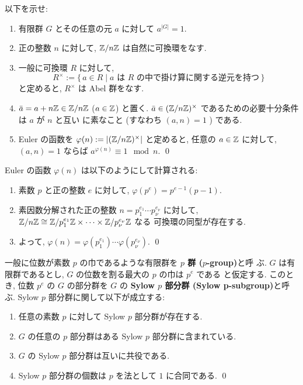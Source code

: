 \documentclass[12pt,twoside]{jarticle}
\def\Z{{\Bbb Z}} %
\def\isom{\cong}
\begin{document}
\begin{question}[Fermat]
  以下を示せ:
  \begin{enumerate}
  \item 有限群 $G$ とその任意の元 $a$ に対して $a^{|G|}=1$. 
  \item 正の整数 $n$ に対して, $\Z/n\Z$ は自然に可換環をなす.
  \item 一般に可換環 $R$ に対して,
    \begin{equation*}
      R^\times :=
      \{\, a\in R \mid \text{$a$ は $R$ の中で掛け算に関する逆元を持つ} \,\}
    \end{equation*}
    と定めると, $R^\times$ は Abel 群をなす.
  \item $\bar a = a + n\Z\in\Z/n\Z$ ($a\in\Z$) と置く. 
    $\bar a\in(\Z/n\Z)^\times$ であるための必要十分条件は $a$ が $n$ と互い
    に素なこと (すなわち $(a,n)=1$ ) である. 
  \item Euler の函数を $\varphi(n):=|(\Z/n\Z)^\times|$ %
    と定めると, 任意の $a\in\Z$ に対して, 
    $(a,n)=1$ ならば $a^{\varphi(n)} \equiv 1 \mod n$.
    \qed
  \end{enumerate}
\end{question}

\begin{question}
  Euler の函数 $\varphi(n)$ は以下のようにして計算される:
  \begin{enumerate}
  \item 素数 $p$ と正の整数 $e$ に対して, $\varphi(p^e)=p^{e-1}(p-1)$.
  \item 素因数分解された正の整数 $n=p_1^{e_1}\cdots p_\nu^{e_\nu}$ に対して, 
    $\Z/n\Z \isom \Z/p_1^{e_1}\Z \times \cdots \times \Z/p_\nu^{e_\nu}\Z$ なる
    可換環の同型が存在する.
  \item よって, $\varphi(n)=\varphi(p_1^{e_1})\cdots\varphi(p_\nu^{e_\nu})$.
    \qed
  \end{enumerate}
\end{question}

\begin{question}[Sylow]
  一般に位数が素数 $p$ の巾であるような有限群を {\bf $p$ 群 ($p$-group)}と呼
  ぶ. $G$ は有限群であるとし, $G$ の位数を割る最大の $p$ の巾は $p^e$ である
  と仮定する. 
  このとき, 位数 $p^e$ の $G$ の部分群を $G$ の 
  {\bf Sylow $p$ 部分群 (Sylow p-subgroup)}と呼ぶ.
  Sylow $p$ 部分群に関して以下が成立する:
  \begin{enumerate}
  \item 任意の素数 $p$ に対して Sylow $p$ 部分群が存在する.
  \item $G$ の任意の $p$ 部分群はある Sylow $p$ 部分群に含まれている.
  \item $G$ の Sylow $p$ 部分群は互いに共役である.
  \item Sylow $p$ 部分群の個数は $p$ を法として $1$ に合同である. \qed
  \end{enumerate}
\end{question}
\end{document}
